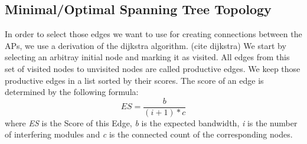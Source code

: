   \subsection{Minimal/Optimal Spanning Tree Topology}
  In order to select those edges we want to use for creating connections between the APs, we use a derivation of the dijkstra algorithm. (cite dijkstra)
  We start by selecting an arbitray initial node and marking it as visited. All edges from this set of visited nodes to unvisited nodes are called productive edges.
  We keep those productive edges in a list sorted by their scores. The score of an edge is determined by the following formula:
  \begin{equation}
    ES=\frac{b}{(i + 1 )* c}
  \end{equation}
  where \textit{ES} is the Score of this Edge, \textit{b} is the expected bandwidth, \textit{i} is the number of interfering modules and \textit{c} is the connected count of the corresponding nodes.
